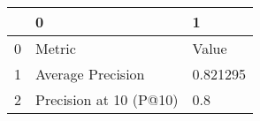 \begin{tabular}{lll}
\toprule
{} &                       0 &         1 \\
\midrule
0 &                  Metric &     Value \\
1 &       Average Precision &  0.821295 \\
2 &  Precision at 10 (P@10) &       0.8 \\
\bottomrule
\end{tabular}
